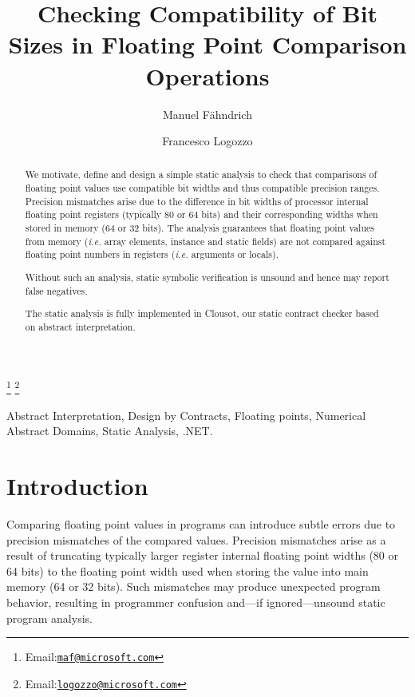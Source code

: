 \documentclass{entcs}
\begin{document}
\begin{frontmatter}
  \title{Checking Compatibility of Bit Sizes in  Floating Point Comparison Operations} 
 \author{Manuel F\"ahndrich}
  \address{Microsoft Research, Redmond} 
 \author{Francesco Logozzo}
  \address{Microsoft Research, Redmond} 
  \thanks[coemail]{Email:\href{mailto:maf@microsoft.conm} {\texttt{\normalshape maf@microsoft.com}}}
 \thanks[myemail]{Email:\href{mailto:logozzo@microsoft.com} {\texttt{\normalshape logozzo@microsoft.com}}} 
 
  \begin{abstract} 
    We motivate, define and design a simple static analysis to check
    that comparisons of floating point values use compatible bit
    widths and thus compatible precision ranges. Precision mismatches
    arise due to the difference in bit widths of processor internal
    floating point registers (typically 80 or 64 bits) and their corresponding widths when
    stored in memory (64 or 32 bits). The analysis guarantees that
    floating point values from memory (\emph{i.e.} array elements,
    instance and static fields) are not compared against floating
    point numbers in registers (\emph{i.e.} arguments or locals).

    Without such an analysis, static symbolic verification is unsound and hence may report false negatives. 

    The static analysis is fully implemented in Clousot, our static contract checker based on abstract interpretation.
  \end{abstract}

  \begin{keyword}
    Abstract Interpretation, Design by Contracts, Floating points, Numerical Abstract Domains, Static Analysis, .NET.
  \end{keyword}
\end{frontmatter}

\section{Introduction}
\label{intro}

Comparing floating point values in programs can introduce subtle
errors due to precision mismatches of the compared values. Precision
mismatches arise as a result of truncating typically larger register
internal floating point widths (80 or 64 bits) to the floating point
width used when storing the value into main memory (64 or 32 bits).
Such mismatches may produce unexpected program behavior, resulting in
programmer confusion and---if ignored---unsound static program
analysis.
\end{document}
